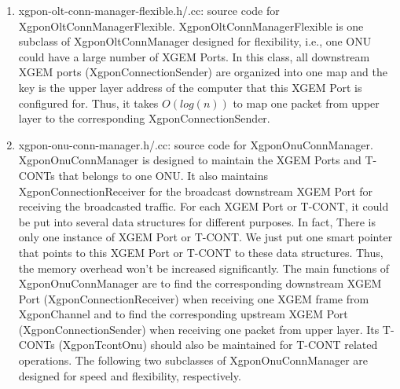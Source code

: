 \begin{enumerate}
 \item xgpon-olt-conn-manager-flexible.h/.cc: source code for {\color{red} XgponOltConnManagerFlexible}. 
XgponOltConnManagerFlexible is one subclass of XgponOltConnManager designed for flexibility, i.e., one ONU 
could have a large number of XGEM Ports. In this class, all downstream XGEM ports (XgponConnectionSender) are 
organized into one map and the key is the upper layer address of the computer that this XGEM Port is configured for.
Thus, it takes $O(log(n))$ to map one packet from upper layer to the corresponding XgponConnectionSender.
\vspace{0.1in}

 \item xgpon-onu-conn-manager.h/.cc: source code for {\color{red} XgponOnuConnManager}. XgponOnuConnManager is designed to 
maintain the XGEM Ports and T-CONTs that belongs to one ONU. It also maintains XgponConnectionReceiver for the broadcast 
downstream XGEM Port for receiving the broadcasted traffic. For each XGEM Port or T-CONT, it could be put into several 
data structures for different purposes. In fact, There is only one instance of XGEM Port or T-CONT. We just put one 
smart pointer that points to this XGEM Port or T-CONT to these data structures. Thus, the memory overhead won't be 
increased significantly. The main functions of XgponOnuConnManager are to find the corresponding downstream XGEM Port 
(XgponConnectionReceiver) when receiving one XGEM frame from XgponChannel and to find the corresponding upstream XGEM Port 
(XgponConnectionSender) when receiving one packet from upper layer. Its T-CONTs (XgponTcontOnu) should also be maintained 
for T-CONT related operations. The following two subclasses of XgponOnuConnManager are designed for speed and flexibility, respectively.


\end{enumerate}
